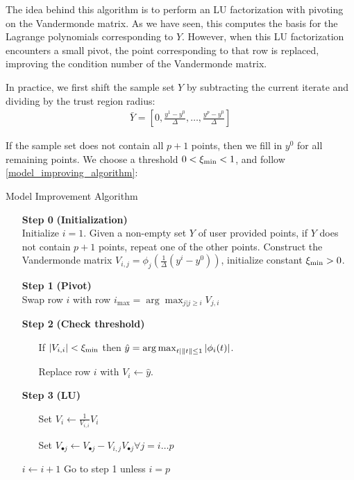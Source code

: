 The idea behind this algorithm is to perform an LU factorization with pivoting on the Vandermonde matrix.
As we have seen, this computes the basis for the Lagrange polynomials corresponding to $Y$.
However, when this LU factorization encounters a small pivot, the point corresponding to that row is replaced, improving the condition number of the Vandermonde matrix.

In practice, we first shift the sample set $Y$ by subtracting the current iterate and dividing by the trust region radius:
\begin{align}
\bar{Y} = [0, \frac{y^1 - y^0}{\Delta}, \ldots, \frac{y^p - y^0}{\Delta}]
\end{align}

If the sample set does not contain all $p+1$ points, then we fill in $y^0$ for all remaining points.
We choose a threshold $0 < \xi_{\text{min}} < 1$, and follow \cref{model_improving_algorithm}:

\begin{algorithm}[H]
    \caption{Model Improvement Algorithm}
    \label{model_improving_algorithm}
    \begin{itemize}
        \item[\textbf{Step 0}] \textbf{(Initialization)} \\
            Initialize $i=1$.
            Given a non-empty set $Y$ of user provided points, if $Y$ does not contain $p+1$ points, repeat one of the other points. 
            Construct the Vandermonde matrix $V_{i,j} = \phi_j(\frac 1 {\Delta}(y^i - y^0))$, initialize constant $\xi_{\text{min}} > 0$.
        \item[\textbf{Step 1}] \textbf{(Pivot)} \\
            Swap row $i$ with row $i_{\max} = \arg \max_{j|j\ge i} V_{j,i} $
        
        \item[\textbf{Step 2}] \textbf{(Check threshold)} \begin{itemize}
                \item[] If $|V_{i,i}| < \xi_{\text{min}}$ then \label{next_point} $ \hat y = \operatorname*{arg\,max}_{t | \|t\|\le 1} |\phi_i(t)|$.
                \item[] Replace row $i$ with $V_{i} \gets \hat y$.
            \end{itemize}
        
        \item[\textbf{Step 3}] \textbf{(LU)} \begin{itemize}
                \item[] Set $V_i \gets \frac{1}{V_{i,i}} V_i$
                \item[] Set $V_{\bullet j} \gets V_{\bullet j} - V_{i,j} V_{\bullet j} \forall j=i \ldots p$
            \end{itemize}
            $i \gets i+1$
            Go to step 1 unless $i = p$
    \end{itemize}
\end{algorithm}

